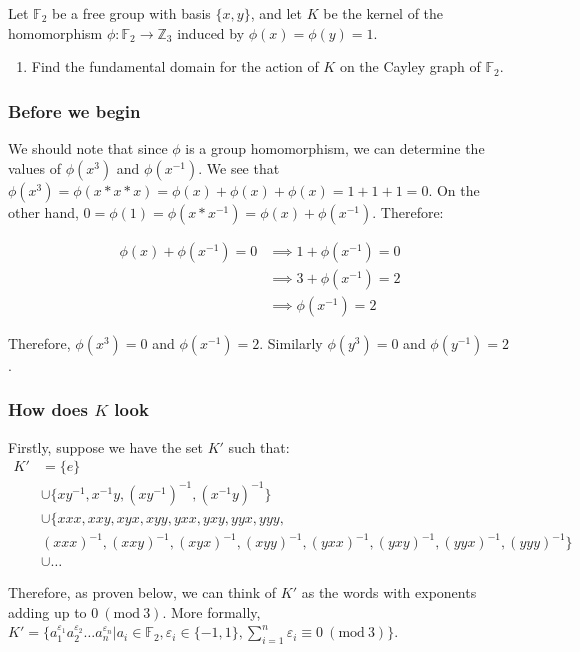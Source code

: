 \documentclass[12pt]{article}%
\newcommand{\F}{\mathbb{F}}
\newcommand{\Z}{\mathbb{Z}}
\newcommand{\Mod}[1]{\ (\mathrm{mod}\ #1)}
\begin{document}
Let $\F_2$ be a free group with basis $\{x,y\}$, and let $K$
 be the kernel of the homomorphism $\phi:\F_2\rightarrow \Z_3$ induced by $\phi(x)=\phi(y)=1$.

\renewcommand{\labelenumi}{\alph{enumi}}
\begin{enumerate}
  \item Find the fundamental domain for the action of $K$ on the Cayley graph of $\F_2$.
\end{enumerate}

\subsubsection*{Before we begin}

We should note that since $\phi$ is a group homomorphism, we can determine the values of $\phi(x^3)$ and
$\phi(x^{-1})$. We see that $\phi(x^3)=\phi(x*x*x)=\phi(x)+\phi(x)+\phi(x)=1+1+1=0$. On the other hand,
$0=\phi(1)=\phi(x*x^{-1})=\phi(x)+\phi(x^{-1})$. Therefore:

\begin{align*}
\phi(x)+\phi(x^{-1})=0
&\implies 1+\phi(x^{-1})=0\\
&\implies 3+\phi(x^{-1})=2\\
&\implies \phi(x^{-1})=2
\end{align*}

Therefore, $\phi(x^3)=0$ and $\phi(x^{-1})=2$.  Similarly  $\phi(y^3)=0$ and $\phi(y^{-1})=2$.

\subsubsection*{How does $K$ look}

Firstly, suppose we have the set $K'$ such that:
\begin{align*}
K'
&=\{e\} \\
&\cup\{xy^{-1}, x^{-1}y, (xy^{-1})^{-1}, (x^{-1}y)^{-1}\} \\
&\cup\{xxx,xxy,xyx,xyy,yxx,yxy,yyx,yyy, \\
&(xxx)^{-1},(xxy)^{-1},(xyx)^{-1},(xyy)^{-1},(yxx)^{-1},(yxy)^{-1},(yyx)^{-1},(yyy)^{-1}\} \\
&\cup \ldots
\end{align*}

Therefore, as proven below, we can think of $K'$ as the words with exponents adding up to $0 \Mod{3}$.
More formally, $K'=\{a_{1}^{\varepsilon_1}a_{2}^{\varepsilon_2}\ldots a_{n}^{\varepsilon_n} | a_i\in \F_2,
\varepsilon_i\in \{-1, 1\}, \sum_{i=1}^{n} \varepsilon_i \equiv 0 \Mod{3}\}$.
\end{document}
